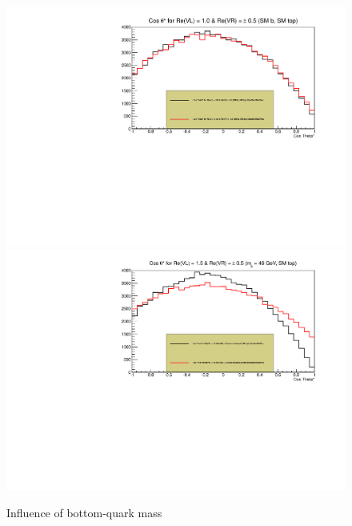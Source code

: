 \begin{figure}[h!]
 \centering
 \includegraphics[width = 0.45 \textwidth]{Afbeeldingen/Chapter_LinkWithTopWidth/CosThetaResults/RVLvsRVR/RVLRVR_CosTheta_NormalBMass_RVRChange_RVLSM.pdf}
 \includegraphics[width = 0.45 \textwidth]{Afbeeldingen/Chapter_LinkWithTopWidth/CosThetaResults/RVLvsRVR/RVLRVR_CosTheta_HeavyBMass_RVRChange_RVLSM.pdf}
 \caption{Influence of bottom-quark mass}
 \label{fig::CosThetaHeavyB}
\end{figure}